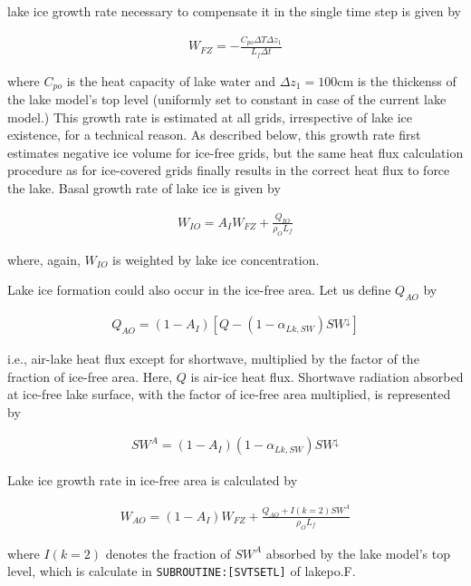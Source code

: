 lake ice growth rate necessary to compensate it in the single time step
is given by

\begin{eqnarray}
    W_{FZ} = - \frac{C_{po} \Delta T \Delta z_1}{L_f \Delta t}
\end{eqnarray}

where \(C_{po}\) is the heat capacity of lake water and
\(\Delta z_1=100 \mathrm{cm}\) is the thickenss of the lake model's top
level (uniformly set to constant in case of the current lake model.)
This growth rate is estimated at all grids, irrespective of lake ice
existence, for a technical reason. As described below, this growth rate
first estimates negative ice volume for ice-free grids, but the same
heat flux calculation procedure as for ice-covered grids finally results
in the correct heat flux to force the lake. Basal growth rate of lake
ice is given by

\begin{eqnarray}
    W_{IO} = A_I W_{FZ} + \frac{Q_{IO}}{\rho_OL_f}
\end{eqnarray}

where, again, \(W_{IO}\) is weighted by lake ice concentration.

Lake ice formation could also occur in the ice-free area. Let us define
\(Q_{AO}\) by

\begin{eqnarray}
    Q_{AO} = (1-A_{I}) [Q-(1-\alpha_{Lk,SW})SW^\downarrow]
\end{eqnarray}

i.e., air-lake heat flux except for shortwave, multiplied by the factor
of the fraction of ice-free area. Here, \(Q\) is air-ice heat flux.
Shortwave radiation absorbed at ice-free lake surface, with the factor
of ice-free area multiplied, is represented by

\begin{eqnarray}
    SW^A = (1-A_I)(1-\alpha_{Lk,SW}) SW^\downarrow
\end{eqnarray}

Lake ice growth rate in ice-free area is calculated by

\begin{eqnarray}
    W_{AO} = (1-A_I)W_{FZ} + \frac{Q_{AO}+I(k=2) SW^A}{\rho_O L_f}
\end{eqnarray}

where \(I(k=2)\) denotes the fraction of \(SW^A\) absorbed by the lake
model's top level, which is calculate in
\texttt{SUBROUTINE:{[}SVTSETL{]}} of lakepo.F.

